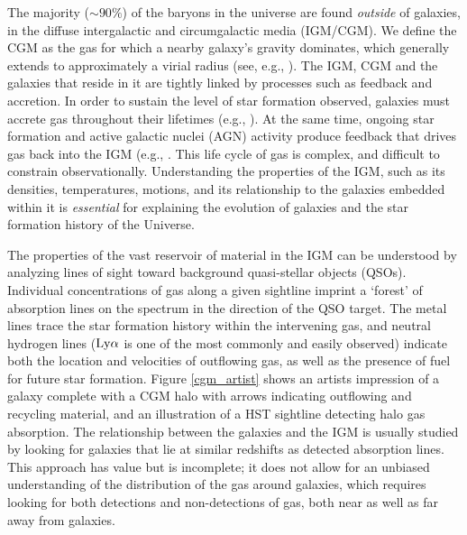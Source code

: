 The majority ($\sim 90\%$) of the baryons in the universe are found \emph{outside} of galaxies, in the diffuse intergalactic and circumgalactic media (IGM/CGM). We define the CGM as the gas for which a nearby galaxy's gravity dominates, which generally extends to approximately a virial radius (see, e.g., \citealt{shull2014}). The IGM, CGM and the galaxies that reside in it are tightly linked by processes such as feedback and accretion. In order to sustain the level of star formation observed, galaxies must accrete gas throughout their lifetimes (e.g., \citealt{oort1966, oort1969, oort1970, tinsley1978, tinsley1980, wakker1999, erb2008, prochaska2009}). At the same time, ongoing star formation and active galactic nuclei (AGN) activity produce feedback that drives gas back into the IGM (e.g., \citealt{veilleux2005, heckman2017, heckman2017_cgm}. This life cycle of gas is complex, and difficult to constrain observationally. Understanding the properties of the IGM, such as its densities, temperatures, motions, and its relationship to the galaxies embedded within it is \emph{essential} for explaining the evolution of galaxies and the star formation history of the Universe. 

The properties of the vast reservoir of material in the IGM can be understood by analyzing lines of sight toward background quasi-stellar objects (QSOs). Individual concentrations of gas along a given sightline imprint a `forest' of absorption lines on the spectrum in the direction of the QSO target. The metal lines trace the star formation history within the intervening gas, and neutral hydrogen lines ($\rm Ly\alpha$ is one of the most commonly and easily observed) indicate both the location and velocities of outflowing gas, as well as the presence of fuel for future star formation. Figure \ref{cgm_artist} shows an artists impression of a galaxy complete with a CGM halo with arrows indicating outflowing and recycling material, and an illustration of a HST sightline detecting halo gas absorption. The relationship between the galaxies and the IGM is usually studied by looking for galaxies that lie at similar redshifts as detected absorption lines. This approach has value but is incomplete; it does not allow for an unbiased understanding of the distribution of the gas around galaxies, which requires looking for both detections and non-detections of gas, both near as well as far away from galaxies.

